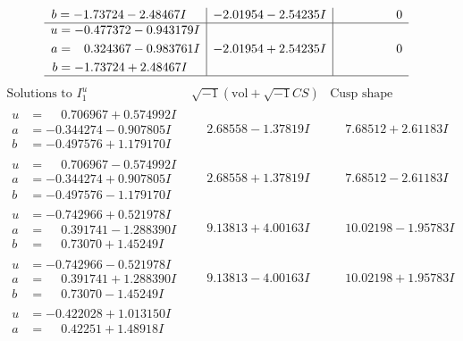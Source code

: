 \documentclass[1p]{elsarticle_modified}
\theoremstyle{definition}
\newcommand{\I}{\sqrt{-1}}
\begin{document}
$$\begin{array}{c|c|c}
\begin{aligned}
b &= -1.73724 - 2.48467 I\end{aligned}
 & -2.01954 - 2.54235 I & \phantom{-0.000000 } 0 \\ \hline\begin{aligned}
u &= -0.477372 - 0.943179 I \\
a &= \phantom{-}0.324367 - 0.983761 I \\
b &= -1.73724 + 2.48467 I\end{aligned}
 & -2.01954 + 2.54235 I & \phantom{-0.000000 } 0\\
 \hline 
 \end{array}$$\newpage$$\begin{array}{c|c|c}  
\text{Solutions to }I^u_{1}& \I (\text{vol} + \sqrt{-1}CS) & \text{Cusp shape}\\
 \hline 
\begin{aligned}
u &= \phantom{-}0.706967 + 0.574992 I \\
a &= -0.344274 - 0.907805 I \\
b &= -0.497576 + 1.179170 I\end{aligned}
 & \phantom{-}2.68558 - 1.37819 I & \phantom{-}7.68512 + 2.61183 I \\ \hline\begin{aligned}
u &= \phantom{-}0.706967 - 0.574992 I \\
a &= -0.344274 + 0.907805 I \\
b &= -0.497576 - 1.179170 I\end{aligned}
 & \phantom{-}2.68558 + 1.37819 I & \phantom{-}7.68512 - 2.61183 I \\ \hline\begin{aligned}
u &= -0.742966 + 0.521978 I \\
a &= \phantom{-}0.391741 - 1.288390 I \\
b &= \phantom{-}0.73070 + 1.45249 I\end{aligned}
 & \phantom{-}9.13813 + 4.00163 I & \phantom{-}10.02198 - 1.95783 I \\ \hline\begin{aligned}
u &= -0.742966 - 0.521978 I \\
a &= \phantom{-}0.391741 + 1.288390 I \\
b &= \phantom{-}0.73070 - 1.45249 I\end{aligned}
 & \phantom{-}9.13813 - 4.00163 I & \phantom{-}10.02198 + 1.95783 I \\ \hline\begin{aligned}
u &= -0.422028 + 1.013150 I \\
a &= \phantom{-}0.42251 + 1.48918 I \\

\end{aligned}
\end{array}$$
\end{document}
